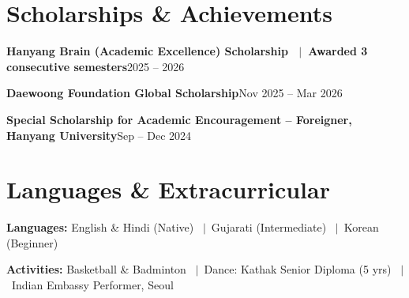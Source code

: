 \documentclass[10pt]{article}
\newcommand{\entry}[2]{\textbf{#1}\hfill{\color{muted}#2}\par}
\begin{document}
\section{Scholarships \& Achievements}
\entry{Hanyang Brain (Academic Excellence) Scholarship \ $\vert$\ Awarded 3 consecutive semesters}{2025 -- 2026}
\vspace{1pt}
\entry{Daewoong Foundation Global Scholarship}{Nov 2025 -- Mar 2026}
\vspace{1pt}
\entry{Special Scholarship for Academic Encouragement -- Foreigner, Hanyang University}{Sep -- Dec 2024}

\section{Languages \& Extracurricular}
\textbf{Languages:} English \& Hindi (Native) \ $\vert$\ Gujarati (Intermediate) \ $\vert$\ Korean (Beginner)\par
\textbf{Activities:} Basketball \& Badminton \ $\vert$\ Dance: Kathak Senior Diploma (5 yrs) \ $\vert$\ Indian Embassy Performer, Seoul\par
\end{document}
